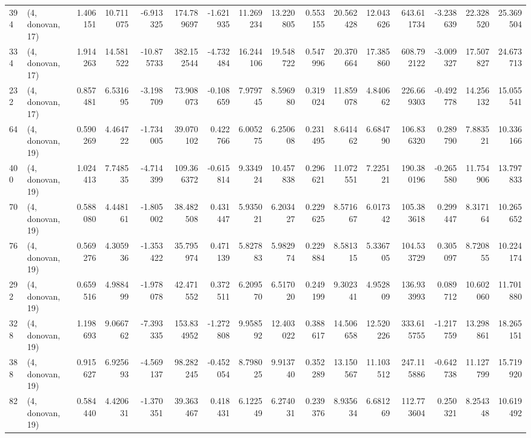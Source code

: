 \begin{tabular}{llrrrrrrrrrrrrrr}
394 &  (4, donovan, 17) &   1.406151 &  10.711075 &  -6.913325 &   174.789697 &  -1.621935 &  11.269234 &  13.220805 &  0.553155 &  20.562428 &  12.043626 &   643.611734 & -3.238639 &  22.328520 &  25.369504 \\
334 &  (4, donovan, 17) &   1.914263 &  14.581522 & -10.875733 &   382.152544 &  -4.732484 &  16.244106 &  19.548722 &  0.547996 &  20.370664 &  17.385860 &   608.792122 & -3.009327 &  17.507827 &  24.673713 \\
232 &  (4, donovan, 17) &   0.857481 &   6.531695 &  -3.198709 &    73.908073 &  -0.108659 &   7.979745 &   8.596980 &  0.319024 &  11.859078 &   4.840662 &   226.669303 & -0.492778 &  14.256132 &  15.055541 \\
64  &  (4, donovan, 19) &   0.590269 &   4.464722 &  -1.734005 &    39.070102 &   0.422766 &   6.005275 &   6.250608 &  0.231495 &   8.641462 &   6.684790 &   106.836320 &  0.289790 &   7.883521 &  10.336166 \\
400 &  (4, donovan, 19) &   1.024413 &   7.748535 &  -4.714399 &   109.366372 &  -0.615814 &   9.334924 &  10.457838 &  0.296621 &  11.072551 &   7.225121 &   190.380196 & -0.265580 &  11.754906 &  13.797833 \\
70  &  (4, donovan, 19) &   0.588080 &   4.448161 &  -1.805002 &    38.482508 &   0.431447 &   5.935021 &   6.203427 &  0.229625 &   8.571667 &   6.017342 &   105.383618 &  0.299447 &   8.317164 &  10.265652 \\
76  &  (4, donovan, 19) &   0.569276 &   4.305936 &  -1.353422 &    35.795974 &   0.471139 &   5.827883 &   5.982974 &  0.229884 &   8.581315 &   5.336705 &   104.533729 &  0.305097 &   8.720855 &  10.224174 \\
292 &  (4, donovan, 19) &   0.659516 &   4.988499 &  -1.978078 &    42.471552 &   0.372511 &   6.209570 &   6.517020 &  0.249199 &   9.302341 &   4.952809 &   136.933993 &  0.089712 &  10.602060 &  11.701880 \\
328 &  (4, donovan, 19) &   1.198693 &   9.066762 &  -7.393335 &   153.834952 &  -1.272808 &   9.958592 &  12.403022 &  0.388617 &  14.506658 &  12.520226 &   333.615755 & -1.217759 &  13.298861 &  18.265151 \\
388 &  (4, donovan, 19) &   0.915627 &   6.925693 &  -4.569137 &    98.282245 &  -0.452054 &   8.798025 &   9.913740 &  0.352289 &  13.150567 &  11.103512 &   247.115886 & -0.642738 &  11.127799 &  15.719920 \\
82  &  (4, donovan, 19) &   0.584440 &   4.420631 &  -1.370351 &    39.363467 &   0.418431 &   6.122549 &   6.274031 &  0.239376 &   8.935634 &   6.681269 &   112.773604 &  0.250321 &   8.254348 &  10.619492 \\

\end{tabular}
